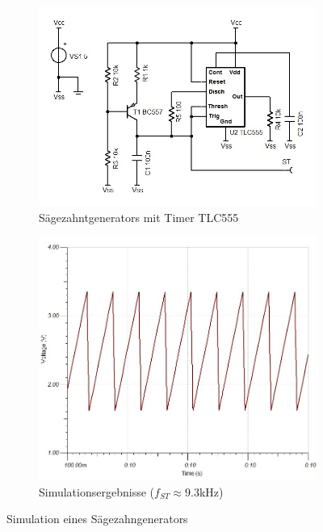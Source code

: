 \begin{figure}[h!]
	\centering
	\begin{subfigure}[b]{0.45\textwidth}
		\includegraphics[width=\textwidth]{src/DC/sim/sch-sawtooth-01.jpg}
		\caption{Sägezahntgenerators mit Timer TLC555}
	\end{subfigure}
	\begin{subfigure}[b]{0.45\textwidth}
		\includegraphics[width=\textwidth]{src/DC/sim/sawtooth-01.jpg}
		\caption{Simulationsergebnisse ($f_{ST} \approx 9.3$kHz)}
	\end{subfigure}
	\caption{Simulation eines Sägezahngenerators}
	\label{fig:sawtooth}
\end{figure}

